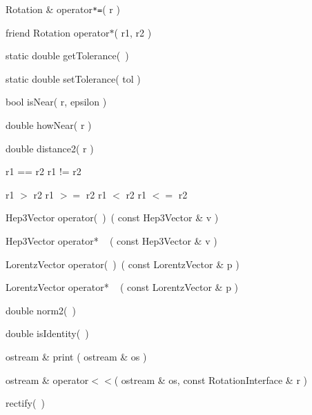 \begin{shortlist}
  \item Rotation \& operator\verb$*=$( r )
  \item friend Rotation operator$*$( r1, r2 )
\end{shortlist}

\begin{shortlist}
  \item static double getTolerance(~)	\see{\ref{eq:epsildefR}}
  \item static double setTolerance( tol )
  \item bool isNear( r, epsilon )		\see{\ref{eq:nearrot}}
  \item double howNear( r ) 			\see{\ref{eq:nearrot}}
  \item double distance2( r )		\see{\ref{eq:dist2rot}}
\end{shortlist}

\begin{shortlist}
  \item r1 == r2 \/\/\/ r1 != r2
  \item r1 $>$ r2 \/\/\/ r1 $>=$ r2 \/\/\/ r1 $<$ r2 \/\/\/ r1 $<=$ r2 
		\see{\ref{eq:ordrot}}
\end{shortlist}

\begin{shortlist}
  \item Hep3Vector operator(~)~( const Hep3Vector \& v ) \see{\ref{eq:Rv}}
  \item Hep3Vector operator* ~ ( const Hep3Vector \& v ) \see{\ref{eq:Rv}}
  \item LorentzVector operator(~)~( const LorentzVector \& p ) \see{\ref{eq:Rv}}
  \item LorentzVector operator* ~ ( const LorentzVector \& p ) \see{\ref{eq:Rv}}
\end{shortlist}


\begin{shortlist}
  \item double norm2(~)		\see{\ref{eq:norm2rot}}
  \item double isIdentity(~)		

  \item ostream \& print ( ostream \& os )
  \item ostream \& operator$<<$( ostream \& os, const RotationInterface \& r )
  \item rectify(~)				\see{\ref{eq:rectRot}}

\end{shortlist}

